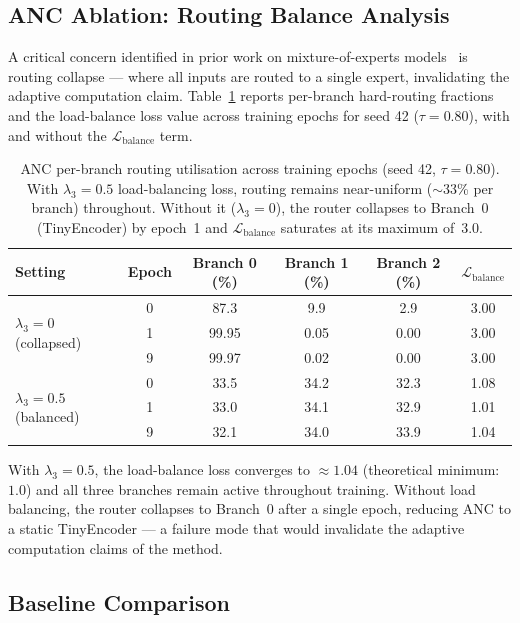 \documentclass{article}
\begin{document}
\subsection{ANC Ablation: Routing Balance Analysis}

A critical concern identified in prior work on mixture-of-experts models~\cite{fedus2022switch} is routing collapse — where all inputs are routed to a single expert, invalidating the adaptive computation claim.
Table~\ref{tab:anc_routing} reports per-branch hard-routing fractions and the load-balance loss value across training epochs for seed 42 ($\tau{=}0.80$), with and without the $\mathcal{L}_{\text{balance}}$ term.

\begin{table}[htbp]
\centering
\caption{ANC per-branch routing utilisation across training epochs (seed 42, $\tau{=}0.80$). With $\lambda_3{=}0.5$ load-balancing loss, routing remains near-uniform ($\sim$33\% per branch) throughout. Without it ($\lambda_3{=}0$), the router collapses to Branch~0 (TinyEncoder) by epoch~1 and $\mathcal{L}_{\text{balance}}$ saturates at its maximum of~3.0.}
\label{tab:anc_routing}
\begin{tabular}{lccccc}
\toprule
Setting & Epoch & Branch 0 (\%) & Branch 1 (\%) & Branch 2 (\%) & $\mathcal{L}_{\text{balance}}$ \\
\midrule
\multirow{3}{*}{$\lambda_3=0$ (collapsed)} & 0 & 87.3 & 9.9 & 2.9 & 3.00 \\
 & 1 & 99.95 & 0.05 & 0.00 & 3.00 \\
 & 9 & 99.97 & 0.02 & 0.00 & 3.00 \\
\midrule
\multirow{3}{*}{$\lambda_3=0.5$ (balanced)} & 0 & 33.5 & 34.2 & 32.3 & 1.08 \\
 & 1 & 33.0 & 34.1 & 32.9 & 1.01 \\
 & 9 & 32.1 & 34.0 & 33.9 & 1.04 \\
\bottomrule
\end{tabular}
\end{table}

With $\lambda_3{=}0.5$, the load-balance loss converges to $\approx 1.04$ (theoretical minimum: $1.0$) and all three branches remain active throughout training.
Without load balancing, the router collapses to Branch~0 after a single epoch, reducing ANC to a static TinyEncoder — a failure mode that would invalidate the adaptive computation claims of the method.

\subsection{Baseline Comparison}
\end{document}
